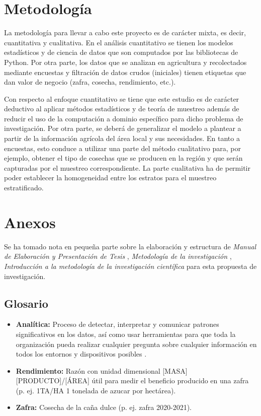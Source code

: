 \documentclass{report}
\begin{document}
\section{Metodología}

La metodología para llevar a cabo este proyecto es de carácter mixta, es decir, cuantitativa y cualitativa. En el análisis cuantitativo se tienen los modelos estadísticos y de ciencia de datos que son computados por las bibliotecas de Python. Por otra parte, los datos que se analizan en agricultura y recolectados mediante encuestas y filtración de datos crudos (iniciales) tienen etiquetas que dan valor de negocio (zafra, cosecha, rendimiento, etc.).

\bigbreak

Con respecto al enfoque cuantitativo se tiene que este estudio es de carácter deductivo al aplicar métodos estadísticos y de teoría de muestreo además de reducir el uso de la computación a dominio específico para dicho problema de investigación. Por otra parte, se deberá de generalizar el modelo a plantear a partir de la información agrícola del área local y sus necesidades. En tanto a encuestas, esto conduce a utilizar una parte del método cualitativo para, por ejemplo, obtener el tipo de cosechas que se producen en la región y que serán capturadas por el muestreo correspondiente. La parte cualitativa ha de permitir poder establecer la homogeneidad entre los estratos para el muestreo estratificado.

\section{Anexos}

Se ha tomado nota en pequeña parte sobre la elaboración y estructura de \textit{Manual de Elaboración y Presentación de Tesis} \cite{universidad-san-carlos-2016}, \textit{Metodología de la investigación} \cite{collado-2014}, \textit{Introducción a la metodología de la investigación científica} \cite{cabezas-2018} para esta propuesta de investigación.

\subsection{Glosario}

\begin{itemize}
    \item \textbf{Analítica:} Proceso de detectar, interpretar y comunicar patrones significativos en los datos, así como usar herramientas para que toda la organización pueda realizar cualquier pregunta sobre cualquier información en todos los entornos y dispositivos posibles \cite{oracle-2021}.
    
    \item \textbf{Rendimiento:} Razón con unidad dimensional [MASA][PRODUCTO]/[ÁREA] útil para medir el beneficio producido en una zafra (p. ej. 1TA/HA 1 tonelada de azucar por hectárea).
    
    \item \textbf{Zafra:} Cosecha de la caña dulce (p. ej. zafra 2020-2021).
\end{itemize}
\end{document}
